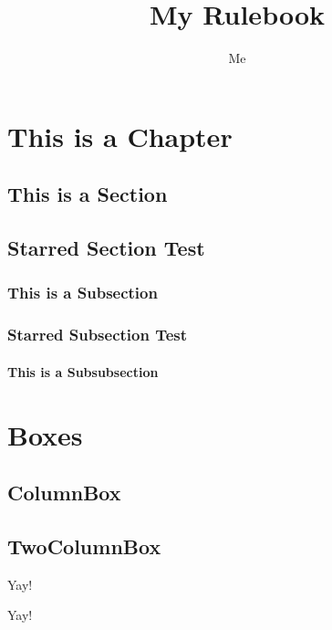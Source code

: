 \documentclass{ShadowTeXSR5}
\title{My Rulebook}
\author{Me}
\begin{document}

\srmaketitle

\tableofcontents

\chapter{This is a Chapter}
\lipsum
\lipsum
\section{This is a Section}
\lipsum[1]
\section*{Starred Section Test}
\lipsum[2]
\subsection{This is a Subsection}
\lipsum[2-5]
\subsection*{Starred Subsection Test}
\lipsum[1-4]
\subsubsection{This is a Subsubsection}
\lipsum
\chapter{Boxes}
\lipsum
\lipsum
\section{ColumnBox}
\lipsum[1]
\begin{columnbox}[l]
\lipsum[1]
\end{columnbox}
\section{TwoColumnBox}
\lipsum
\begin{twocolbox}
\centering\Huge Yay!\\
\normalsize\lipsum[1-3]
\end{twocolbox}
\lipsum
\begin{twocolbox}
\centering\Huge Yay!\\
\normalsize\lipsum[1-3]
\end{twocolbox}
\lipsum
\lipsum
\lipsum
\end{document}
